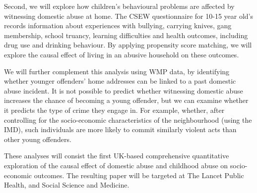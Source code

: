 \documentclass[11pt, a4paper]{article}
\begin{document}
%
%



Second, we will explore how children's behavioural problems are affected by witnessing domestic abuse at home. The CSEW questionnaire for 10-15 year old's records information about experiences with bullying, carrying knives, gang membership, school truancy, learning difficulties and health outcomes, including drug use and drinking behaviour. By applying propensity score matching, we will explore the causal effect of living in an abusive household on these outcomes.

We will further complement this analysis using WMP data, by identifying whether younger offenders' home addresses can be linked to a past domestic abuse incident. It is not possible to predict whether witnessing domestic abuse increases the chance of becoming a young offender, but we can examine whether it predicts the type of crime they engage in. For example, whether, after controlling for the socio-economic characteristics of the neighbourhood (using the IMD), such individuals are more likely to commit similarly violent acts than other young offenders.


 These analyses will consist the first UK-based comprehensive quantitative exploration of the causal effect of domestic abuse and childhood abuse on socio-economic outcomes. The resulting paper will be targeted at The Lancet Public Health, and Social Science and Medicine.
 
\end{document}
